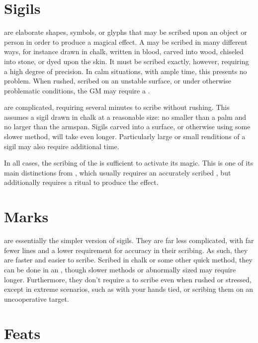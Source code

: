 
\section{Sigils}

\capital{\sigils} are elaborate shapes, symbols, or glyphs that may be scribed upon an object or person in order to produce a magical effect.
A {\sigil} may be scribed in many different ways, for instance drawn in chalk, written in blood, carved into wood, chiseled into stone, or dyed upon the skin.
It must be scribed exactly, however, requiring a high degree of precision.
In calm situations, with ample time, this presents no problem.
When rushed, scribed on an unstable surface, or under otherwise problematic conditions, the GM may require a  {\test}.

\capital{\sigils} are complicated, requiring several minutes to scribe without rushing.
This assumes a sigil drawn in chalk at a reasonable size: no smaller than a palm and no larger than the  armspan.
Sigils carved into a surface, or otherwise using some slower method, will take even longer.
Particularly large or small renditions of a sigil may also require additional time.

In all cases, the scribing of the {\sigil} is sufficient to activate its magic.
This is one of its main distinctions from , which usually requires an accurately scribed , but additionally requires a ritual to produce the effect.

\section{Marks}

\capital{\sigilmarks} are essentially the simpler version of sigils.
They are far less complicated, with far fewer lines and a lower requirement for accuracy in their scribing.
As such, they are faster and easier to scribe.
Scribed in chalk or some other quick method, they can be done in an {\action}, though slower methods or abnormally sized {\sigilmarks} may require longer.
Furthermore, they don't require a {\test} to scribe even when rushed or stressed, except in extreme scenarios, such as with your hands tied, or scribing them on an uncooperative target.

\section{Feats}

